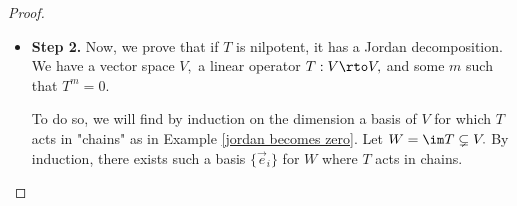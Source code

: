 \begin{proof}
\begin{itemize}
    \textbf{Full Proof.} Now, we still need to show that this splitting exists. Consider the vector space $V$; $TV = \im T$ lies inside of $V$ (it cannot possibly take $V$ to a higher-dimensional space), and so we obtain the chain \[V \supset TV \supset T(TV) \supset T(T(T(V)) \supset \cdots .\] The dimension can only drop finitely many times\footnote{In fact, this argument relies on the fact that $V$ is finite-dimensional!}, since $T^i(V)$ cannot have negative dimension, so there exists some stable dimension $m$ between $\dim T$ and $0$ such that \[
    T^m V = T^{m + 1}V = T^{m + 2}V = \cdots.
    \]
    
        Let 
    \[
    U \coloneqq T^mV = \im(T^m)
    \text{ and }
    W = \ker(T^m).
    \]
    
    First, $T$ is nilpotent on $W$ because $W = \ker(T^m),$ so $(T |_W)^m = 0$, which is the definition of being nilpotent. Also, $T|_U$ is invertible because $U = \im(T|_U)$, so $T|_U$ is surjective from $U$ to itself, which implies that it is invertible. Lastly, $W \cap U = \{v \in U: T^m = 0\},$ by definition, which is precisely the zero vector, because $T$ is invertible on $U$ so it maps only the zero vector to the zero vector. Using the rank-nullity theorem, $\dim \ker T^m + \dim \im T^m = \dim V, $ so by Theorem \ref{splitting thm}, $W \oplus U$ is in fact a splitting.
    
    \item \textbf{Step 2.} Now, we prove that if $T$ is nilpotent, it has a Jordan decomposition. We have a vector space $V,$ a linear operator $T: V \rto V,$ and some $m$ such that $T^m = 0.$
    
    To do so, we will find by induction on the dimension a basis of $V$ for which $T$ acts in "chains" as in Example \ref{jordan becomes zero}. Let $W = \im T \subsetneq V.$ By induction, there exists such a basis $\{\vec{e}_i\}$ for $W$ where $T$ acts in chains.
    

\end{itemize}
\end{proof}
